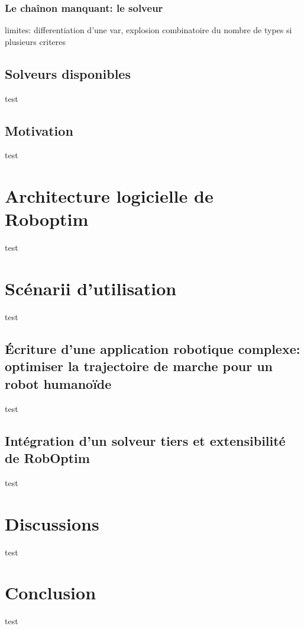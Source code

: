 \subsubsection{Le chaînon manquant: le solveur}



limites: differentiation d'une var, explosion combinatoire du nombre
de types si plusieurs criteres



\subsection{Solveurs disponibles}

test

\subsection{Motivation}

test


\section{Architecture logicielle de Roboptim}

test

\section{Scénarii d'utilisation}

test

\subsection[FIXME]{\'Ecriture d'une application robotique complexe: optimiser la trajectoire de marche pour un robot humanoïde}

test

\subsection{Intégration d'un solveur tiers et extensibilité de RobOptim}

test

\section{Discussions}

test

\section{Conclusion}

test
